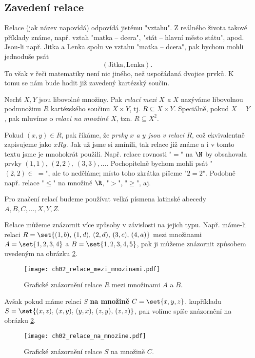 \subsection{Zavedení relace}
Relace (jak název napovídá) odpovídá jistému "vztahu". Z reálného života takové příklady známe, např. vztah "matka -- dcera", "stát -- hlavní město státu", apod. Jsou-li např. Jitka a Lenka spolu ve vztahu "matka -- dcera", pak bychom mohli jednoduše psát
\begin{equation*}
    (\text{Jitka}, \text{Lenka}).
\end{equation*}
To však v řeči matematiky není nic jiného, než uspořádaná dvojice prvků. K tomu se nám bude hodit již zavedený kartézský součin.
\begin{definition}[Relace]\label{def:relace}
    Nechť $X,Y$ jsou libovolné množiny. Pak \emph{relací mezi $X$ a $X$} nazýváme libovolnou podmnožinu $R$ kartézského součinu $X\times Y$, tj. $R\subseteq X \times Y$. Speciálně, pokud $X=Y$, pak mluvíme o \emph{relaci na množině $X$}, tzn. $R\subseteq X^2$.
\end{definition}
Pokud $(x,y)\in R$, pak říkáme, že \emph{prvky $x$ a $y$ jsou v relaci $R$}, což ekvivalentně zapisujeme jako $xRy$. Jak už jsme si zmínili, tak relace již známe a i v tomto textu jsme je mnohokrát použili. Např. relace rovnosti "$=$" na $\N$ by obsahovala prvky $(1,1),\,(2,2),\,(3,3),\dots$. Pochopitelně bychom mohli psát "$(2,2)\in\;=$", ale to neděláme; místo toho zkrátka píšeme "$2=2$". Podobně např. relace "$\leq$" na množině $\R$, "$>$", "$\geq$", aj.
\begin{convention}
    Pro značení relací budeme používat velká písmena latinské abecedy $A,B,C,\dots,X,Y,Z$.
\end{convention}
Relace můžeme znázornit více způsoby v závislosti na jejich typu. Např. máme-li relaci $R=\set{(1,b),\,(1,d),\,(2,d),\,(3,c),\,(4,a)}$ mezi množinami $A=\set{1,2,3,4}$ a $B=\set{1,2,3,4,5}$, pak ji můžeme znázornit způsobem uvedeným na obrázku \ref{fig:relace_mezi_mnozinami}.
\begin{figure}[H]
    \centering
    \texttt{[image: ch02\_relace\_mezi\_mnozinami.pdf]}
    \caption{Grafické znázornění relace $R$ mezi množinami $A$ a $B$.}
    \label{fig:relace_mezi_mnozinami}
\end{figure}
Avšak pokud máme relaci $S$ \textbf{na množině} $C=\set{x,y,z}$, kupříkladu $S=\set{(x,z),\,(x,y),\,(y,x),\,(z,y),\,(z,z)}$, pak volíme spíše znázornění na obrázku \ref{fig:relace_mezi_mnozinami}.
\begin{figure}[H]
    \centering
    \texttt{[image: ch02\_relace\_na\_mnozine.pdf]}
    \caption{Grafické znázornění relace $S$ na množině $C$.}
    \label{fig:relace_mezi_mnozinami}
\end{figure}
